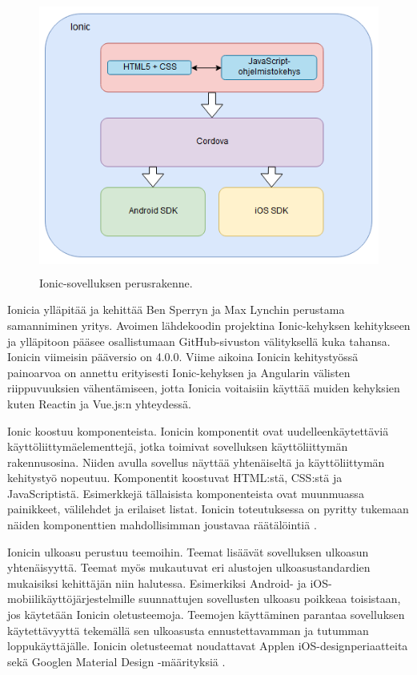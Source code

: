 \documentclass[utf8]{gradu3}
\begin{document}
\begin{figure}[h]\centering
  \includegraphics[height=9cm,keepaspectratio]{ionic-structure}
  \caption[Ionic-sovelluksen perusrakenne]
  {Ionic-sovelluksen perusrakenne.}
  \label{fig:ionic-structure}
\end{figure}

Ionicia ylläpitää ja kehittää Ben Sperryn ja Max Lynchin perustama samanniminen yritys. Avoimen lähdekoodin projektina Ionic-kehyksen kehitykseen ja ylläpitoon pääsee osallistumaan GitHub-sivuston välityksellä kuka tahansa. Ionicin viimeisin pääversio on 4.0.0. Viime aikoina Ionicin kehitystyössä painoarvoa on annettu erityisesti Ionic-kehyksen ja Angularin välisten riippuvuuksien vähentämiseen, jotta Ionicia voitaisiin käyttää muiden kehyksien kuten Reactin ja Vue.js:n yhteydessä.

Ionic koostuu komponenteista. Ionicin komponentit ovat uudelleenkäytettäviä käyttöliittymäelementtejä, jotka toimivat sovelluksen käyttöliittymän rakennusosina. Niiden avulla sovellus näyttää yhtenäiseltä ja käyttöliittymän kehitystyö nopeutuu. Komponentit koostuvat HTML:stä, CSS:stä ja JavaScriptistä. Esimerkkejä tällaisista komponenteista ovat muunmuassa painikkeet, välilehdet ja erilaiset listat. Ionicin toteutuksessa on pyritty tukemaan näiden komponenttien mahdollisimman joustavaa räätälöintiä \parencite[]{ionic-documentation}.

Ionicin ulkoasu perustuu teemoihin. Teemat lisäävät sovelluksen ulkoasun yhtenäisyyttä. Teemat myös mukautuvat eri alustojen ulkoasustandardien mukaisiksi kehittäjän niin halutessa. Esimerkiksi Android- ja iOS-mobiilikäyttöjärjestelmille suunnattujen sovellusten ulkoasu poikkeaa toisistaan, jos käytetään Ionicin oletusteemoja. Teemojen käyttäminen parantaa sovelluksen käytettävyyttä tekemällä sen ulkoasusta ennustettavamman ja tutumman loppukäyttäjälle. Ionicin oletusteemat noudattavat Applen iOS-designperiaatteita \parencite[]{ios-design-guide} sekä Googlen Material Design -määrityksiä \parencite[]{google-material-design}.
\end{document}
